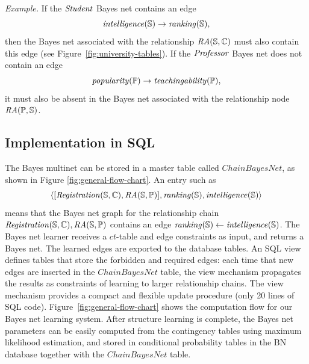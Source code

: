 \documentclass{vldb}
\newcommand{\ct}{\mathit{ct}}
\begin{document}
{\em Example.} 
If the $\student$ Bayes net contains an edge $$\it{intelligence}(\S) \rightarrow \it{ranking}(\S),$$ then the Bayes net associated with the relationship $\it{\ra(\S,\C)}$ must also contain this edge (see Figure~\ref{fig:university-tables}). 
If the $\prof$ Bayes net does not contain an edge $$\it{popularity}(\P) \rightarrow \it{teachingability}(\P),$$ it must also be absent in the Bayes net associated with the relationship node $\ra(\P,\S)$.


\subsection{Implementation in SQL} 

The Bayes multinet can be stored in a master table called {\em $ChainBayesNet$}, as shown in Figure \ref{fig:general-flow-chart}. 
An entry such as $$\langle [\reg(\S,\C),\ra(\S,\P)],\it{ranking}(\S),\it{intelligence}(\S)\rangle$$ means that the 
Bayes net graph for the relationship chain $\reg(\S,\C),\ra(\S,\P)$ contains an edge $\it{ranking}(\S)\leftarrow \it{intelligence}(\S)$. 
The Bayes net learner receives a $\ct$-table and edge constraints as input, and returns a Bayes net. The learned edges are exported to the database tables. 
An SQL view defines tables that store the forbidden and required edges: each time that new edges are inserted in the $ChainBayesNet$ table, 
the view mechanism propagates the results as constraints of learning to larger relationship chains.
The view mechanism provides a compact and flexible update procedure (only 20 lines of SQL code).
Figure~\ref{fig:general-flow-chart} shows the computation flow for our Bayes net learning system. 
After structure learning is complete, the Bayes net parameters can be easily computed from the contingency tables using maximum likelihood estimation, and stored in conditional probability tables in the BN database together with the $ChainBayesNet$ table.
\end{document}
